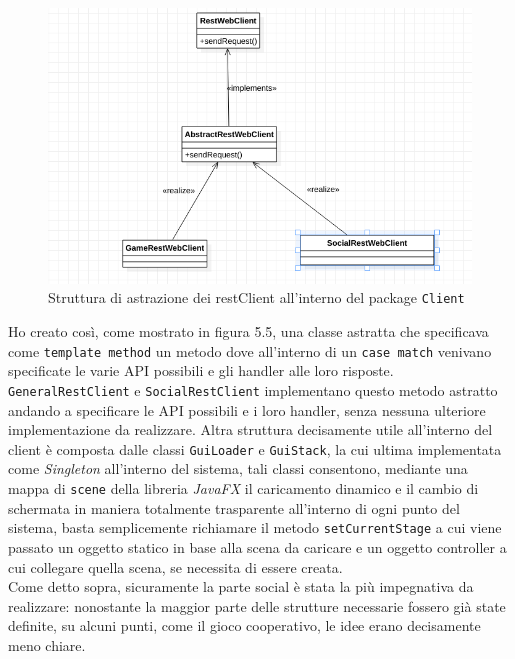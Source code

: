 \begin{figure}[H]
	\includegraphics[width=\textwidth,height=\textheight,keepaspectratio]{RestWebClient}
	\caption{Struttura di astrazione dei restClient all'interno del package \texttt{Client}}
\end{figure}

Ho creato così, come mostrato in figura 5.5, una classe astratta che specificava come \texttt{template method} un metodo dove all'interno di un \texttt{case match} venivano specificate le varie API possibili e gli handler alle loro risposte.
\texttt{GeneralRestClient} e \texttt{SocialRestClient} implementano questo metodo astratto andando a specificare le API possibili e i loro handler, senza nessuna ulteriore implementazione da realizzare.
Altra struttura decisamente utile all'interno del client è composta dalle classi \texttt{GuiLoader} e \texttt{GuiStack}, la cui ultima implementata come \textit{Singleton} all'interno del sistema, tali classi consentono, mediante una mappa di \texttt{scene} della libreria \textit{JavaFX} il caricamento dinamico e il cambio di schermata in maniera totalmente trasparente all'interno di ogni punto del sistema, basta semplicemente richiamare il metodo \texttt{setCurrentStage} a cui viene passato un oggetto statico in base alla scena da caricare e un oggetto controller a cui collegare quella scena, se necessita di essere creata.\\
Come detto sopra, sicuramente la parte social è stata la più impegnativa da realizzare: nonostante la maggior parte delle strutture necessarie fossero già state definite, su alcuni punti, come il gioco cooperativo, le idee erano decisamente meno chiare.\\

